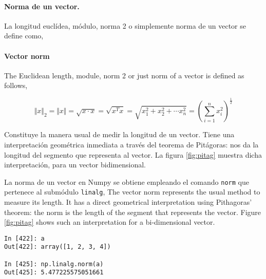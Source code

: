\begin{paracol}{2}
\paragraph{Norma de un vector.} La longitud euclídea, módulo,  norma 2 o simplemente norma  de un vector se define como,
\switchcolumn
\paragraph{Vector norm} The Euclidean length, module, norm 2 or just norm of a vector is defined as follows,
\end{paracol}
\begin{equation*}
\Vert x \Vert_2 =\Vert x \Vert =\sqrt{x\cdot x}=\sqrt{x^Tx}=\sqrt{x_1^2+x_2^2+\cdots x_n^2}=\left( \sum_{i=1}^nx_i^2 \right)^\frac{1}{2}
\end{equation*}
\begin{paracol}{2}
Constituye la manera usual de medir la longitud de un vector. Tiene una interpretación geométrica inmediata a través del teorema de Pitágoras: nos da la longitud del segmento que representa al vector. La figura \ref{fig:pitag} muestra dicha interpretación, para un vector bidimensional.

La norma de un vector en Numpy se obtiene empleando el  comando \texttt{norm} que pertenece al submódulo \texttt{linalg},
\switchcolumn
The vector norm represents the usual method to measure its length. It has a direct geometrical interpretation using Pithagoras' theorem: the norm is the length of the segment that represents the vector. Figure \ref{fig:pitag} shows such an interpretation for a bi-dimensional vector.
\end{paracol}
\begin{center}
    \begin{minipage}{0.3\textwidth}
        \begin{verbatim}
In [422]: a
Out[422]: array([1, 2, 3, 4])

In [425]: np.linalg.norm(a)
Out[425]: 5.477225575051661
\end{verbatim}
\end{minipage}
\end{center}

